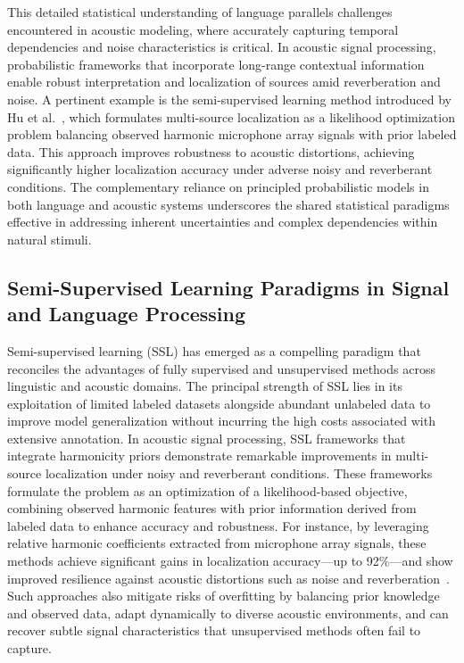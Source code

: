 \documentclass[sigconf]{acmart}
\begin{document}
This detailed statistical understanding of language parallels challenges encountered in acoustic modeling, where accurately capturing temporal dependencies and noise characteristics is critical. In acoustic signal processing, probabilistic frameworks that incorporate long-range contextual information enable robust interpretation and localization of sources amid reverberation and noise. A pertinent example is the semi-supervised learning method introduced by Hu et al.~\cite{ref52}, which formulates multi-source localization as a likelihood optimization problem balancing observed harmonic microphone array signals with prior labeled data. This approach improves robustness to acoustic distortions, achieving significantly higher localization accuracy under adverse noisy and reverberant conditions. The complementary reliance on principled probabilistic models in both language and acoustic systems underscores the shared statistical paradigms effective in addressing inherent uncertainties and complex dependencies within natural stimuli.

\subsection{Semi-Supervised Learning Paradigms in Signal and Language Processing}

Semi-supervised learning (SSL) has emerged as a compelling paradigm that reconciles the advantages of fully supervised and unsupervised methods across linguistic and acoustic domains. The principal strength of SSL lies in its exploitation of limited labeled datasets alongside abundant unlabeled data to improve model generalization without incurring the high costs associated with extensive annotation. In acoustic signal processing, SSL frameworks that integrate harmonicity priors demonstrate remarkable improvements in multi-source localization under noisy and reverberant conditions. These frameworks formulate the problem as an optimization of a likelihood-based objective, combining observed harmonic features with prior information derived from labeled data to enhance accuracy and robustness. For instance, by leveraging relative harmonic coefficients extracted from microphone array signals, these methods achieve significant gains in localization accuracy—up to 92\%—and show improved resilience against acoustic distortions such as noise and reverberation~\cite{ref52}. Such approaches also mitigate risks of overfitting by balancing prior knowledge and observed data, adapt dynamically to diverse acoustic environments, and can recover subtle signal characteristics that unsupervised methods often fail to capture.
\end{document}
